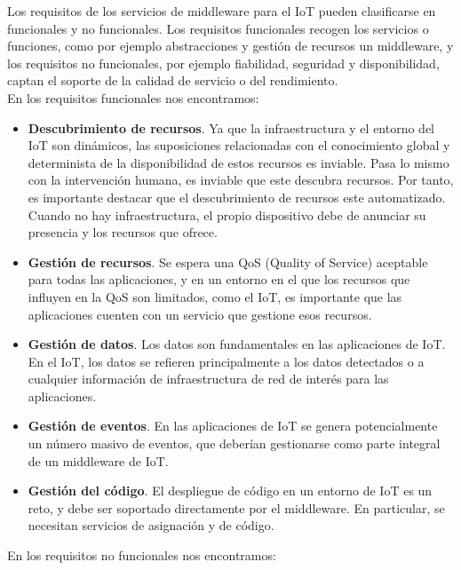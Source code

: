 Los requisitos de los servicios de middleware para el IoT pueden clasificarse en funcionales y no funcionales. Los requisitos funcionales recogen los servicios o funciones, como por ejemplo abstracciones y gestión de recursos un middleware, y los requisitos no funcionales, por ejemplo fiabilidad, seguridad y disponibilidad, captan el soporte de la calidad de servicio o del rendimiento.\\
 
 En los requisitos funcionales nos encontramos:
 
 \begin{itemize}
     \item \textbf{Descubrimiento de recursos}. Ya que la infraestructura y el entorno del IoT son dinámicos, las suposiciones relacionadas con el conocimiento global y determinista de la disponibilidad de estos recursos es inviable. Pasa lo mismo con la intervención humana, es inviable que este descubra recursos. Por tanto, es importante destacar que el descubrimiento de recursos este automatizado. Cuando no hay infraestructura, el propio dispositivo debe de anunciar su presencia y los recursos que ofrece.
     \item \textbf{Gestión de recursos}. Se espera una QoS (Quality of Service) aceptable para todas las aplicaciones, y en un entorno en el que los recursos que influyen en la QoS son limitados, como el IoT, es importante que las aplicaciones cuenten con un servicio que gestione esos recursos.
     \item \textbf{Gestión de datos}. Los datos son fundamentales en las aplicaciones de IoT. En el IoT, los datos se refieren principalmente a los datos detectados o a cualquier información de infraestructura de red de interés para las aplicaciones.
     \item \textbf{Gestión de eventos}. En las aplicaciones de IoT se genera potencialmente un número masivo de eventos, que deberían gestionarse como parte integral de un middleware de IoT.
     \item \textbf{Gestión del código}. El despliegue de código en un entorno de IoT es un reto, y debe ser soportado directamente por el middleware. En particular, se necesitan servicios de asignación y de código.
 \end{itemize}
 
 En los requisitos no funcionales nos encontramos:
 
